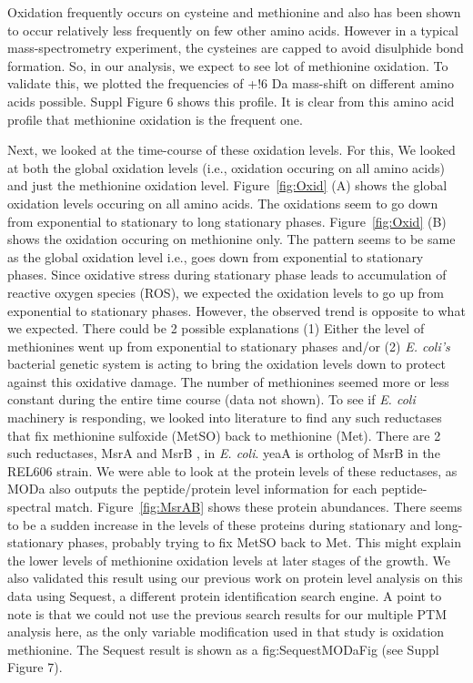 \documentclass[12pt]{article}
\begin{document}
Oxidation frequently occurs on cysteine and methionine and also has been shown to occur relatively less frequently on few other amino acids. However in a typical mass-spectrometry experiment, the cysteines are capped to avoid disulphide bond formation. So, in our analysis, we expect to see lot of methionine oxidation. To validate this, we plotted the frequencies of +!6 Da mass-shift on different amino acids possible. Suppl Figure 6 shows this profile. It is clear from this amino acid profile that methionine oxidation is the frequent one.

Next, we looked at the time-course of these oxidation levels. For this, We looked at both the global oxidation levels (i.e., oxidation occuring on all amino acids) and just the methionine oxidation level. Figure~\ref{fig:Oxid} (A) shows the global oxidation levels occuring on all amino acids. The oxidations seem to go down from exponential to stationary to long stationary phases. Figure~\ref{fig:Oxid} (B) shows the oxidation occuring on methionine only. The pattern seems to be same as the global oxidation level i.e., goes down from exponential to stationary phases. Since oxidative stress during stationary phase leads to accumulation of reactive oxygen species (ROS), we expected the oxidation levels to go up from exponential to stationary phases. However, the observed trend is opposite to what we expected. There could be 2 possible explanations (1) Either the level of methionines went up from exponential to stationary phases and/or (2) \emph{E. coli's} bacterial genetic system is acting to bring the oxidation levels down to protect against this oxidative damage. The number of methionines seemed more or less constant during the entire time course (data not shown). To see if \emph{E. coli} machinery is responding, we looked into literature to find any such reductases that fix methionine sulfoxide (MetSO) back to methionine (Met).  There are 2 such reductases, MsrA \cite{Abramsetal1981} and MsrB \cite{Grimaudetal2001}, in \emph{E. coli}. yeaA is ortholog of MsrB in the REL606 strain. We were able to look at the protein levels of these reductases, as MODa also outputs the peptide/protein level information for each peptide-spectral match. Figure~\ref{fig:MsrAB} shows these protein abundances. There seems to be a sudden increase in the levels of these proteins during stationary and long-stationary phases, probably trying to fix MetSO back to Met. This might explain the lower levels of methionine oxidation levels at later stages of the growth. We also validated this result using our previous work \cite{Houseretal2015} on protein level analysis on this data using Sequest, a different protein identification search engine. A point to note is that we could not use the previous search results for our multiple PTM analysis here, as the only variable modification used in that study is oxidation methionine. The Sequest result is shown as a fig:SequestMODaFig (see Suppl Figure 7).
\end{document}
